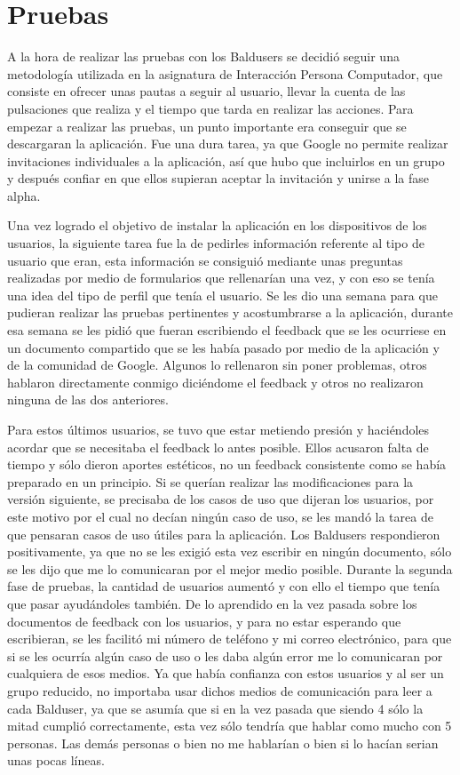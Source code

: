 \section{Pruebas}
\label{secc:pruebas}

A la hora de realizar las pruebas con los Baldusers se decidió seguir una metodología utilizada en la asignatura de Interacción Persona Computador, que consiste en ofrecer unas pautas a seguir al usuario, llevar la cuenta de las pulsaciones que realiza y el tiempo que tarda en realizar las acciones.
Para empezar a realizar las pruebas, un punto importante era conseguir que se descargaran la aplicación.
Fue una dura tarea, ya que Google no permite realizar invitaciones individuales a la aplicación, así que hubo que incluirlos en un grupo y después confiar en que ellos supieran aceptar la invitación y unirse a la fase alpha.

Una vez logrado el objetivo de instalar la aplicación en los dispositivos de los usuarios, la siguiente tarea fue la de pedirles información referente al tipo de usuario que eran, esta información se consiguió mediante unas preguntas realizadas por medio de formularios que rellenarían una vez, y con eso se tenía una idea del tipo de perfil que tenía el usuario.
Se les dio una semana para que pudieran realizar las pruebas pertinentes y acostumbrarse a la aplicación, durante esa semana se les pidió que fueran escribiendo el feedback que se les ocurriese en un documento compartido que se les había pasado por medio de la aplicación y de la comunidad de Google.
Algunos lo rellenaron sin poner problemas, otros hablaron directamente conmigo diciéndome el feedback y otros no realizaron ninguna de las dos anteriores.

Para estos últimos usuarios, se tuvo que estar metiendo presión y haciéndoles acordar que se necesitaba el feedback lo antes posible. Ellos acusaron falta de tiempo y sólo dieron aportes estéticos, no un feedback consistente como se había preparado en un principio.
Si se querían realizar las modificaciones para la versión siguiente, se precisaba de los casos de uso que dijeran los usuarios, por este motivo por el cual no decían ningún caso de uso, se les mandó la tarea de que pensaran casos de uso útiles para la aplicación.
Los Baldusers respondieron positivamente, ya que no se les exigió esta vez escribir en ningún documento, sólo se les dijo que me lo comunicaran por el mejor medio posible.
Durante la segunda fase de pruebas, la cantidad de usuarios aumentó y con ello el tiempo que tenía que pasar ayudándoles también.
De lo aprendido en la vez pasada sobre los documentos de feedback con los usuarios, y para no estar esperando que escribieran, se les facilitó mi número de teléfono y mi correo electrónico, para que si se les ocurría algún caso de uso o les daba algún error me lo comunicaran por cualquiera de esos medios. Ya que había confianza con estos usuarios y al ser un grupo reducido, no importaba usar dichos medios de comunicación para leer a cada Balduser, ya que se asumía que si en la vez pasada que siendo 4 sólo la mitad cumplió correctamente, esta vez sólo tendría que hablar como mucho con 5 personas. Las demás personas o bien no me hablarían o bien si lo hacían serian unas pocas líneas.

